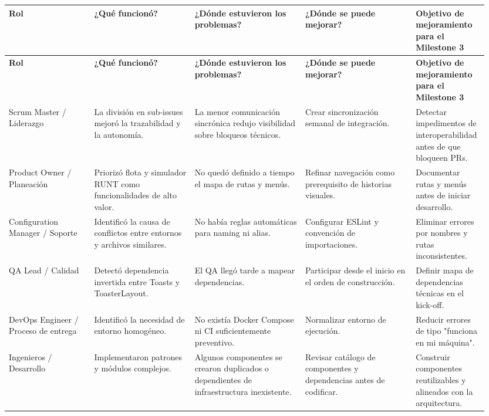 \documentclass[11pt,a4paper]{article}
\begin{document}
\begin{landscape}
\begingroup
\tiny
\setlength{\tabcolsep}{3pt}
\begin{longtable}{P{0.17\linewidth}P{0.20\linewidth}P{0.22\linewidth}P{0.22\linewidth}P{0.14\linewidth}}
\toprule
\textbf{Rol} & \textbf{¿Qué funcionó?} & \textbf{¿Dónde estuvieron los problemas?} & \textbf{¿Dónde se puede mejorar?} & \textbf{Objetivo de mejoramiento para el Milestone 3} \\
\midrule
\endfirsthead
\toprule
\textbf{Rol} & \textbf{¿Qué funcionó?} & \textbf{¿Dónde estuvieron los problemas?} & \textbf{¿Dónde se puede mejorar?} & \textbf{Objetivo de mejoramiento para el Milestone 3} \\
\midrule
\endhead
\bottomrule
\endlastfoot
Scrum Master / Liderazgo & La división en sub-issues mejoró la trazabilidad y la autonomía. & La menor comunicación sincrónica redujo visibilidad sobre bloqueos técnicos. & Crear sincronización semanal de integración. & Detectar impedimentos de interoperabilidad antes de que bloqueen PRs. \\
Product Owner / Planeación & Priorizó flota y simulador RUNT como funcionalidades de alto valor. & No quedó definido a tiempo el mapa de rutas y menús. & Refinar navegación como prerequisito de historias visuales. & Documentar rutas y menús antes de iniciar desarrollo. \\
Configuration Manager / Soporte & Identificó la causa de conflictos entre entornos y archivos similares. & No había reglas automáticas para naming ni alias. & Configurar ESLint y convención de importaciones. & Eliminar errores por nombres y rutas inconsistentes. \\
QA Lead / Calidad & Detectó dependencia invertida entre Toasts y ToasterLayout. & El QA llegó tarde a mapear dependencias. & Participar desde el inicio en el orden de construcción. & Definir mapa de dependencias técnicas en el kick-off. \\
DevOps Engineer / Proceso de entrega & Identificó la necesidad de entorno homogéneo. & No existía Docker Compose ni CI suficientemente preventivo. & Normalizar entorno de ejecución. & Reducir errores de tipo "funciona en mi máquina". \\
Ingenieros / Desarrollo & Implementaron patrones y módulos complejos. & Algunos componentes se crearon duplicados o dependientes de infraestructura inexistente. & Revisar catálogo de componentes y dependencias antes de codificar. & Construir componentes reutilizables y alineados con la arquitectura. \\
\end{longtable}
\endgroup
\end{landscape}
\end{document}
